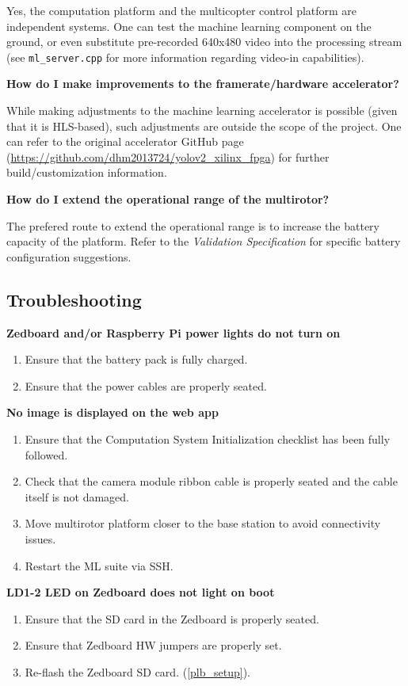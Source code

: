 \documentclass[10pt,letterpaper]{article}
\begin{document}
Yes, the computation platform and the multicopter control platform are independent systems. One can test the machine learning component on the ground, or even substitute pre-recorded 640x480 video into the processing stream (see \texttt{ml\_server.cpp} for more information regarding video-in capabilities).

\textbf{How do I make improvements to the framerate/hardware accelerator?}

While making adjustments to the machine learning accelerator is possible (given that it is HLS-based), such adjustments are outside the scope of the project. One can refer to the original accelerator GitHub page (\url{https://github.com/dhm2013724/yolov2_xilinx_fpga}) for further build/customization information.

\textbf{How do I extend the operational range of the multirotor?}

The prefered route to extend the operational range is to increase the battery capacity of the platform. Refer to the \textit{Validation Specification} for specific battery configuration suggestions.

\subsection{Troubleshooting}
\textbf{Zedboard and/or Raspberry Pi power lights do not turn on}
\begin{enumerate}
\item Ensure that the battery pack is fully charged.
\item Ensure that the power cables are properly seated.
\end{enumerate}

\textbf{No image is displayed on the web app}
\begin{enumerate}
\item Ensure that the Computation System Initialization checklist has been fully followed.
\item Check that the camera module ribbon cable is properly seated and the cable itself is not damaged.
\item Move multirotor platform closer to the base station to avoid connectivity issues.
\item Restart the ML suite via SSH.
\end{enumerate}

\textbf{LD1-2 LED on Zedboard does not light on boot}
\begin{enumerate}
\item Ensure that the SD card in the Zedboard is properly seated.
\item Ensure that Zedboard HW jumpers are properly set.
\item Re-flash the Zedboard SD card. (\ref{plb_setup}).
\end{enumerate}
\end{document}
